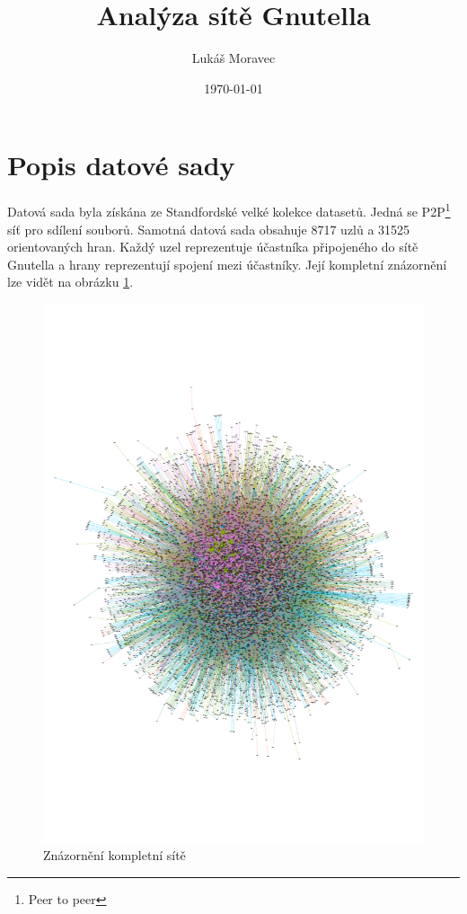\documentclass[A4]{article}
\title{Analýza sítě Gnutella}
\author{Lukáš Moravec}
\date{\today}
\begin{document}
\begin{titlepage}
    \maketitle
\end{titlepage}
    
\section{Popis datové sady}
\cite{dataset} Datová sada byla získána ze \cite{snapnets} Standfordské velké kolekce datasetů. Jedná se P2P\footnote{Peer to peer}
síť pro sdílení souborů. Samotná datová sada obsahuje 8717 uzlů a 31525 orientovaných hran. Každý uzel reprezentuje účastníka připojeného
do sítě Gnutella a hrany reprezentují spojení mezi účastníky. Její kompletní znázornění lze vidět na obrázku \ref{network:full}.

\begin{figure}
    \centering
    \includegraphics[width=1\textwidth]{export.pdf}
    \caption{Znázornění kompletní sítě}
    \label{network:full}
\end{figure}
\end{document}
